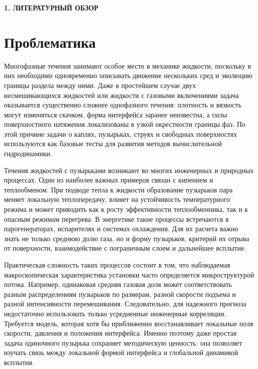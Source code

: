 \newpage
\begin{center}
  \textbf{\large 1. ЛИТЕРАТУРНЫЙ ОБЗОР}
\end{center}

\section{Проблематика}

Многофазные течения занимают особое место в механике жидкости, поскольку в них
необходимо одновременно описывать движение нескольких сред и эволюцию границы
раздела между ними. Даже в простейшем случае двух несмешивающихся жидкостей или
жидкости с газовыми включениями задача оказывается существенно сложнее
однофазного течения: плотность и вязкость могут изменяться скачком, форма
интерфейса заранее неизвестна, а силы поверхностного натяжения локализованы в
узкой окрестности границы фаз. По этой причине задачи о каплях, пузырьках,
струях и свободных поверхностях используются как базовые тесты для развития
методов вычислительной гидродинамики.

Течения жидкостей с пузырьками возникают во многих инженерных и природных
процессах. Один из наиболее важных примеров связан с кипением и теплообменом.
При подводе тепла к жидкости образование пузырьков пара меняет локальную
теплопередачу, влияет на устойчивость температурного режима и может приводить
как к росту эффективности теплообменника, так и к опасным режимам перегрева.
В энергетике такие процессы встречаются в парогенераторах, испарителях и
системах охлаждения. Для их расчета важно знать не только среднюю долю газа, но
и форму пузырьков, критерий их отрыва от поверхности, взаимодействие с
пограничным слоем и дальнейшее всплытие.

Практическая сложность таких процессов состоит в том, что наблюдаемая
макроскопическая характеристика установки часто определяется микроструктурой
потока. Например, одинаковая средняя газовая доля может соответствовать разным
распределениям пузырьков по размерам, разной скорости подъема и разной
интенсивности перемешивания. Следовательно, для надежного прогноза
недостаточно использовать только усредненные инженерные корреляции. Требуется
модель, которая хотя бы приближенно восстанавливает локальные поля скорости,
давления и положения интерфейса. Именно поэтому даже простая задача
одиночного пузырька сохраняет методическую ценность: она позволяет изучать
связь между локальной формой интерфейса и глобальной динамикой всплытия.

